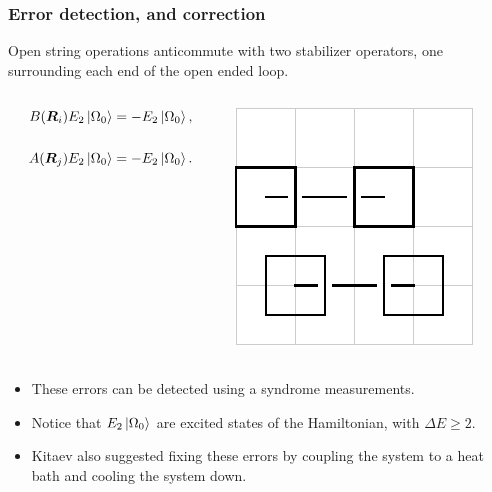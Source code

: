 \documentclass{beamer}
\renewcommand{\(}{\left(}
\renewcommand{\)}{\right)}
\renewcommand{\[}{\left[}
\renewcommand{\]}{\right]}
\begin{document}
\begin{frame}
    \frametitle{Error detection, and correction}

    Open string operations anticommute with two stabilizer operators, one surrounding each end of the open ended loop.  
    \begin{columns}
        \begin{column}{0.5\textwidth}
            \begin{align*}
                B(\bm R_i) E_2 \ket{\Omega_0} = -E_2 \ket{\Omega_0}, \\ 
                \\
                A(\bm R_j) E_2 \ket{\Omega_0} = -E_2 \ket{\Omega_0}.
            \end{align*}
        \end{column}
        \begin{column}{0.5\textwidth}
            \centering
            \includegraphics[scale=0.9]{open_closed_loop.pdf}
        \end{column}
    \end{columns}
    \pause
    \begin{itemize}
    \item These errors can be detected using a syndrome measurements. 
    \item Notice that $E_2\ket{\Omega_0}$ are excited states of the Hamiltonian, with $\Delta E \geqslant 2$. 
    \item Kitaev also suggested fixing these errors by coupling the system to a heat bath and cooling the system down. 
    \end{itemize}
    
\end{frame}


\end{document}
